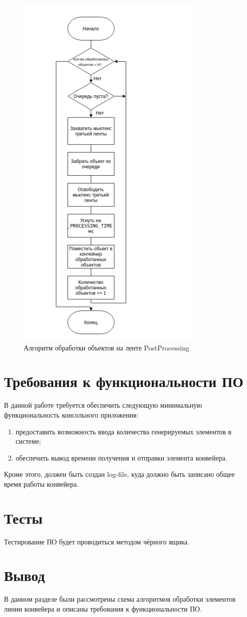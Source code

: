         \begin{figure}[h!]
            \centering
            \includegraphics[scale=0.85]{post.png}
\caption{Алгоритм обработки объектов на ленте PostProcessing}
            \label{png:post}
        \end{figure} 

    \section{Требования к функциональности ПО}
        В данной работе требуется обеспечить следующую минимальную функциональность консольного приложения:
        \begin{enumerate}
            \item предоставить возможность ввода количества генерируемых элементов в системе;
            \item обеспечить вывод времени получения и отправки элемента конвейера.
        \end{enumerate}
	Кроме этого, должен быть создан log-file, куда должно быть записано общее время работы конвейера.

    \section{Тесты}
        Тестирование ПО будет проводиться методом чёрного ящика. 


    \section{Вывод}
        В данном разделе были рассмотрены схема алгоритмов 
        обработки элементов линии конвейера и
        описаны требования к функциональности ПО.
        

\newpage